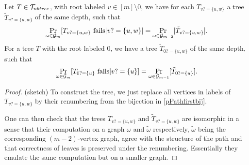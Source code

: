 \begin{lemm}\label{lemmrelabeltree}
Let $T\in \mathcal{T}_{nbtree}$, with root labeled $v\in[m]\setminus{0}$, we have for each $T_{v?=\{u,w\}}$ a tree $\tilde T_{v?=\{u,w\}}$ of the same depth, such that
\begin{align}
\Pr_{\omega\in\mathcal{G}_m}[T_{v?=\{u,w\}}\text{ fails}|v?=\{u,w\}]=\Pr_{\omega\in\mathcal{G}_{m-2}}[\tilde T_{v?=\{u,w\}}].
\end{align}
For a tree $T$ with the root labeled $0$, we have a tree $\tilde T_{0?=\{u,w\}}$ of the same depth, such that
\begin{align}
\Pr_{\omega\in\mathcal{G}_m}[T_{0?=\{u\}}\text{ fails}|v?=\{u\}]=\Pr_{\omega\in\mathcal{G}_{m-1}}[\tilde T_{0?=\{u\}}].
\end{align}
\end{lemm}
\begin{proof}(sketch) To construct the tree, we just replace all vertices in labels of $T_{v?=\{u,w\}}$ by their renumbering from the bijection in \eqref{pPathfirstbij}.

One can then check that the trees $T_{v?=\{u,w\}}$ and $\tilde T_{v?=\{u,w\}}$ are isomorphic in a sense that their computation on a graph $\omega$ and $\tilde \omega$ respectively, $\tilde \omega$ being the corresponding $(m-2)$-vertex graph, agree with the structure of the path and that correctness of leaves is preserved under the renumbering. Essentially they emulate the same computation but on a smaller graph.
\end{proof}


